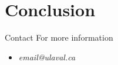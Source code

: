 \documentclass[aspectratio=169]{beamer}
\begin{document}
\section{Conclusion}

\begin{frame}[label=conclu]{Contact}
	For more information
	\begin{itemize}
		\item \emph{email@ulaval.ca}
	\end{itemize}
\end{frame}



\end{document}
